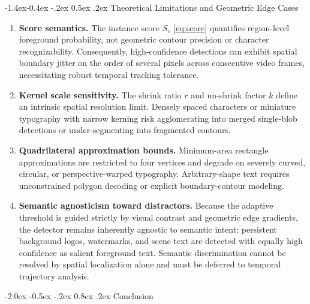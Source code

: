 \documentclass[11pt,a4paper]{article}
\makeatletter
\renewcommand\section{\@startsection {section}{1}{\z@}%
                                   {-2.0ex \@plus -0.5ex \@minus -.2ex}%
                                   {0.8ex \@plus.2ex}%
                                   {\normalfont\large\bfseries}}
\renewcommand\subsection{\@startsection{subsection}{2}{\z@}%
                                     {-1.4ex\@plus -0.4ex \@minus -.2ex}%
                                     {0.5ex \@plus .2ex}%
                                     {\normalfont\normalsize\bfseries}}
\newcommand{\1}{\mathbf{1}}
\makeatother
\begin{document}
\subsection{Theoretical Limitations and Geometric Edge Cases}
\begin{enumerate}
    \item \textbf{Score semantics.} The instance score $S_v$ \eqref{eq:score} quantifies region-level foreground probability, not geometric contour precision or character recognizability. Consequently, high-confidence detections can exhibit spatial boundary jitter on the order of several pixels across consecutive video frames, necessitating robust temporal tracking tolerance.
    \item \textbf{Kernel scale sensitivity.} The shrink ratio $r$ and un-shrink factor $k$ define an intrinsic spatial resolution limit. Densely spaced characters or miniature typography with narrow kerning risk agglomerating into merged single-blob detections or under-segmenting into fragmented contours.
    \item \textbf{Quadrilateral approximation bounds.} Minimum-area rectangle approximations are restricted to four vertices and degrade on severely curved, circular, or perspective-warped typography. Arbitrary-shape text requires unconstrained polygon decoding or explicit boundary-contour modeling.
    \item \textbf{Semantic agnosticism toward distractors.} Because the adaptive threshold is guided strictly by visual contrast and geometric edge gradients, the detector remains inherently agnostic to semantic intent: persistent background logos, watermarks, and scene text are detected with equally high confidence as salient foreground text. Semantic discrimination cannot be resolved by spatial localization alone and must be deferred to temporal trajectory analysis.
\end{enumerate}

\section{Conclusion}
\end{document}
